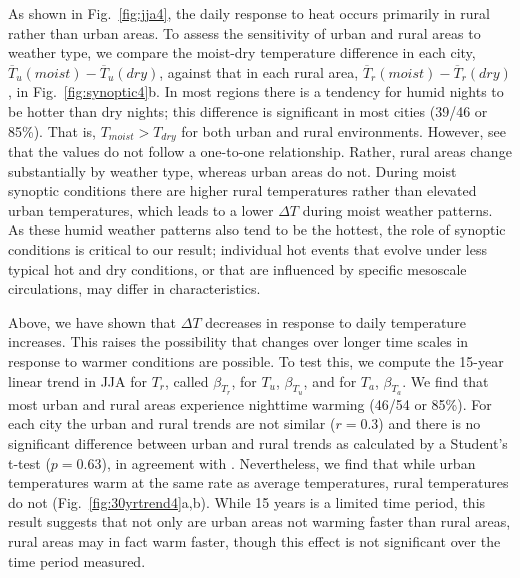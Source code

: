{As shown in Fig.~\ref{fig:jja4}, the daily response to heat occurs primarily in rural rather than urban areas. To assess the sensitivity of urban and rural areas to weather type, we compare the moist-dry temperature difference in each city, $  \overline{T}_{u}( {moist} )  -  \overline{T}_{u}( {dry} ) $, 
against that in each rural area, $\overline{T}_{r}( {moist} ) -  \overline{T}_{r}( {dry} ) $, in Fig.~\ref{fig:synoptic4}b. 
In most regions there is a tendency for humid nights to be hotter than dry nights; this difference is significant in most cities (39/46 or 85\%).  
That is, $T_{moist} > T_{dry}$ for both urban and rural environments.
However, see that the values do not follow a one-to-one relationship. %
Rather, rural areas change substantially by weather type, whereas urban areas do not. During moist synoptic conditions there are higher rural temperatures rather than elevated urban temperatures, which leads to a lower $\Delta T$ during moist weather patterns. 
As these humid weather patterns also tend to be the hottest, the role of synoptic conditions is critical to our result; individual hot events that evolve under less typical hot and dry conditions, or that are influenced by specific mesoscale circulations, may differ in characteristics. 

Above, we have shown that $\Delta T$ decreases in response to daily temperature increases. This raises the possibility that changes over longer time scales in response to warmer conditions are possible. 
To test this, we compute the 15-year linear trend in JJA for $T_r$, called $\beta_{T_r}$, for $T_u$, $\beta_{T_u}$, and for $T_a$, $\beta_{{T_a}}$.  We find that most urban and rural areas experience nighttime warming (46/54 or 85\%). For each city the urban and rural trends are not similar ($r= 0.3$) and there is no significant difference between urban and rural trends as calculated by a Student's t-test ($p = 0.63$), in agreement with \cite{peterson2003assessment}. Nevertheless, we find that while urban temperatures warm at the same rate as average temperatures, rural temperatures do not (Fig.~\ref{fig:30yrtrend4}a,b).
While 15 years is a limited time period, this result suggests that not only are urban areas not warming faster than rural areas, rural areas may in fact warm faster, though this effect is not significant over the time period measured. 

}
